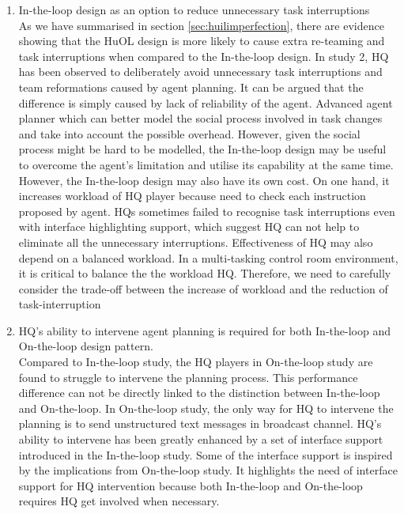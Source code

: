 \begin{enumerate}
\item In-the-loop design as an option to reduce unnecessary task interruptions \\
As we have summarised in section \ref{sec:huilimperfection}, there are evidence showing that the HuOL design is more likely to cause extra re-teaming and task interruptions when compared to the In-the-loop design. In study 2, HQ has been observed to deliberately avoid unnecessary task interruptions and team reformations caused by agent planning. It can be argued that the difference is simply caused by lack of reliability of the agent. Advanced agent planner which can better model the social process involved in task changes and take into account the possible overhead. However, given the social process might be hard to be modelled, the In-the-loop design may be useful to overcome the agent's limitation and utilise its capability at the same time.  \\

However, the In-the-loop design may also have its own cost. On one hand, it increases workload of HQ player because need to check each instruction proposed by agent. HQs sometimes failed to recognise task interruptions even with interface highlighting support, which suggest HQ can not help to eliminate all the unnecessary interruptions. Effectiveness of HQ may also depend on a balanced workload. In a multi-tasking control room environment, it is critical to balance the the workload HQ. Therefore, we need to carefully consider the trade-off between the increase of workload and the reduction of task-interruption \\

\item HQ's ability to intervene agent planning is required for both In-the-loop and On-the-loop design pattern.\\
Compared to In-the-loop study, the HQ players in On-the-loop study are found to struggle to intervene the planning process. This performance difference can not be directly linked to the distinction between In-the-loop and On-the-loop. In On-the-loop study, the only way for HQ to intervene the planning is to send unstructured text messages in broadcast channel. HQ's ability to intervene has been greatly enhanced by a set of interface support introduced in the In-the-loop study. Some of the interface support is inspired by the implications from On-the-loop study. It highlights the need of interface support for HQ intervention because both In-the-loop and On-the-loop requires HQ get involved when necessary. \\


\end{enumerate}
